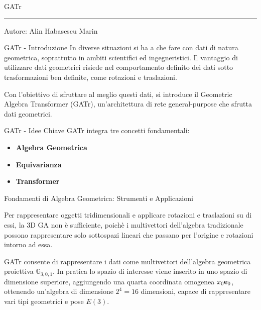 \begin{frame}
    \Huge GATr
    \rule{\textwidth}{.25pt}
    \small{Autore: Alin Habasescu Marin}
\end{frame}
\begin{frame}{GATr - Introduzione}
    In diverse situazioni si ha a che fare con dati di natura geometrica, soprattutto
    in ambiti scientifici ed ingegneristici. Il vantaggio di utilizzare dati geometrici
    risiede nel comportamento definito dei dati sotto trasformazioni ben definite, come 
    rotazioni e traslazioni.

    Con l'obiettivo di sfruttare al meglio questi dati, si introduce il 
    Geometric Algebra Transformer (GATr), un'architettura di rete general-purpose 
    che sfrutta dati geometrici. 
\end{frame}

\begin{frame}{GATr - Idee Chiave}
    GATr integra tre concetti fondamentali:
    \begin{itemize}
        \item \textbf{Algebra Geometrica}
        \item \textbf{Equivarianza}
        \item \textbf{Transformer}
    \end{itemize}
\end{frame}

\begin{frame}{Fondamenti di Algebra Geometrica: Strumenti e Applicazioni}

    Per rappresentare oggetti tridimensionali e applicare rotazioni e traslazioni su di 
    essi, la 3D GA non è sufficiente, poichè i multivettori dell'algebra tradizionale 
    possono rappresentare solo sottospazi lineari che passano per l'origine e rotazioni 
    intorno ad essa. 

    GATr consente di rappresentare i dati come multivettori dell'algebra geometrica 
    proiettiva \(\mathbb{G}_{3,0,1}\). In pratica lo spazio di interesse viene inserito 
    in uno spazio di dimensione superiore, aggiungendo una quarta coordinata omogenea 
    \(x_0 \mathbf{e}_{0}\), ottenendo un'algebra di dimensione \(2^4 = 16\) dimensioni, capace di 
    rappresentare vari tipi geometrici e pose \(E(3)\).
\end{frame}

